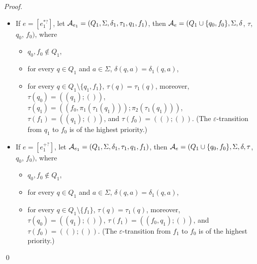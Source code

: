 \begin{proof}
\begin{itemize}
  \item If $e = [e_1^{\ast?}]$, let $\mathcal{A}_{e_1} = (Q_1, \Sigma, \delta_1, \tau_1, q_1, f_1)$, then $\mathcal{A}_e = (Q_1 \cup \{q_0, f_0\}, \Sigma, \delta$, $\tau$, $q_0$, $f_0)$, where 
  \begin{itemize}
  \item $q_0, f_0 \not \in Q_1$,
  
    \item for every $q \in Q_1$ and $a \in \Sigma$, $\delta(q, a) = \delta_1(q, a)$, 
    
    \item for every $q \in Q_1 \setminus \{q_1, f_1\}$,  $\tau(q) = \tau_1(q)$, moreover, $\tau(q_0) = ((q_1); ())$, $\tau(q_1) = ((f_0, \pi_1(\tau_1(q_1))); \pi_2(\tau_1(q_1)))$, $\tau(f_1) = ((q_1); ())$, and $\tau(f_0) = ((); ())$. (The $\varepsilon$-transition from $q_1$ to $f_0$ is of the highest priority.)
  \end{itemize}  
%
  \item If $e = [e_1^{+?}]$, let $\mathcal{A}_{e_1} = (Q_1,
  \Sigma, \delta_1, \tau_1, q_1, f_1)$, then $\mathcal{A}_e = (Q_1 \cup \{q_0, f_0\}, \Sigma,
  \delta, \tau$, $q_0$, $f_0)$, where 
  \begin{itemize}
  \item $q_0, f_0 \not \in Q_1$,
  
    \item for every $q \in Q_1$ and $a \in \Sigma$, $\delta(q, a) = \delta_1(q, a)$, 
    
    \item for every $q \in Q_1 \setminus \{f_1\}$,  $\tau(q) = \tau_1(q)$, moreover, $\tau(q_0) = ((q_1); ())$, $\tau(f_1) = ((f_0, q_1); ())$, and $\tau(f_0) = ((); ())$. (The $\varepsilon$-transition from $f_1$ to $f_0$ is of the highest priority.)
  \end{itemize}  
\end{itemize}
\qed
\end{proof}



